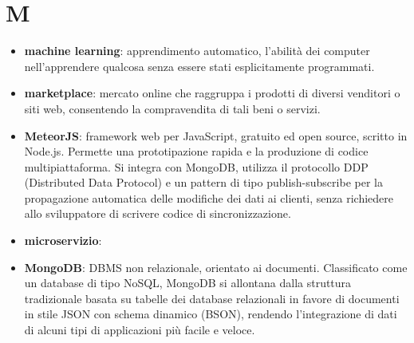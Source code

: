 \section{M}
\begin{itemize} 
	\item \textbf{machine learning}: apprendimento automatico, l'abilità dei computer nell'apprendere qualcosa senza essere stati esplicitamente programmati.
	\item \textbf{marketplace}: mercato online che raggruppa i prodotti di diversi venditori o siti web, consentendo la compravendita di tali beni o servizi.
	\item \textbf{MeteorJS}: framework web per JavaScript, gratuito ed open source, scritto in Node.js. Permette una prototipazione rapida e la produzione di codice multipiattaforma. Si integra con MongoDB, utilizza il protocollo DDP (Distributed Data Protocol) e un pattern di tipo publish-subscribe per la propagazione automatica delle modifiche dei dati ai clienti, senza richiedere allo sviluppatore di scrivere codice di sincronizzazione.
	\item \textbf{microservizio}:
	\item \textbf{MongoDB}: DBMS non relazionale, orientato ai documenti. Classificato come un database di tipo NoSQL, MongoDB si allontana dalla struttura tradizionale basata su tabelle dei database relazionali in favore di documenti in stile JSON con schema dinamico (BSON), rendendo l'integrazione di dati di alcuni tipi di applicazioni più facile e veloce. 
\end{itemize}
